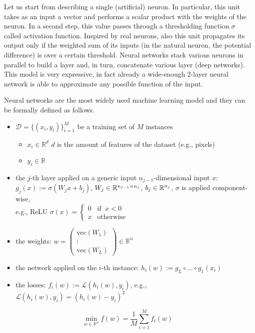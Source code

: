 \documentclass[10pt,a4paper]{article}
\begin{document}
\begin{example} Let us start from describing a single (artificial) neuron. In particular, this unit takes as an input a vector and performs a scalar product with the weights of the neuron. In a second step, this value passes through a thresholding function $\sigma$ called activation function. Inspired by real neurons, also this unit propagates its output only if the weighted sum of its inputs (in the natural neuron, the potential difference)  is over a certain threshold. Neural networks stack various neurons in parallel to build a layer and, in turn, concatenate various layer (deep networks). This model is very expressive, in fact already a wide-enough 2-layer neural network is able to approximate any possible function of the input.
	\par Neural networks are the most widely used machine learning model and they can be formally defined as follows. 
	\begin{itemize}
		\item $\mathcal{D}=\{(x_i, y_i)\}_{i=1}^{M}$ be a training set of $M$ instances
		\begin{itemize}
			\item $x_i \in \mathbb{R}^{d}$ $d$ is the amount of features of the dataset (e.g., pixels)
			\item $y_i\in\mathbb{R}$
		\end{itemize}
		\item the $j$-th layer applied on a generic input $n_{j-1}$-dimensional input $x$:\\
		$g_j(x) := \sigma (W_j x +b_j )$, $W_j \in \mathbb{R}^{n_{j-1}\times n_j}$, $b_j \in \mathbb{R}^{n_j}$, $\sigma$ is applied component-wise,\\ e.g., ReLU $\sigma(x)= \begin{cases} 0 & \text{if} \;\;x<0\\ x &\text{otherwise} \end{cases}$ %
		\item the weights: $w = \begin{pmatrix}
			\text{vec}(W_1)\\
			\vdots\\
			\text{vec}(W_L)
		\end{pmatrix}\in \mathbb{R}^{n}$
		\item the network applied on the $i$-th instance: $h_i(w):=g_L \circ \dots \circ g_1(x_i)$ 
		\item the losses: $f_i(w):=\mathcal{L}(h_i(w),y_i)$, e.g., $\mathcal{L}(h_i(w),y_i)= (h_i(w)-y_i)^2$%
	\end{itemize}
	
	\begin{equation*}
		\min_{w\in \mathbb{R}^n} f(w) = \frac{1}{M}\sum_{i=1}^{M} f_i(w)
	\end{equation*}
\end{example}
\end{document}
